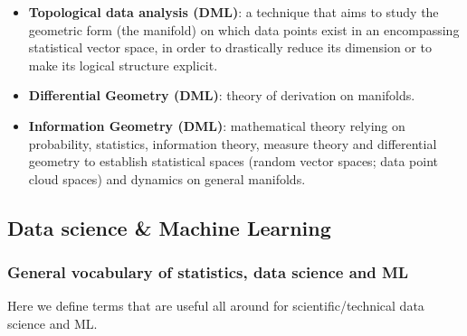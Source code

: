 \documentclass{article}
\begin{document}
\begin{itemize}
	\item \textbf{Topological data analysis (DML)}: a technique that aims to study the geometric form (the manifold) on which data points exist in an encompassing statistical vector space, in order to drastically reduce its dimension or to make its logical structure explicit.

	\item \textbf{Differential Geometry (DML)}: theory of derivation on manifolds.

	\item \textbf{Information Geometry (DML)}: mathematical theory relying on probability, statistics, information theory, measure theory and differential geometry to establish statistical spaces (random vector spaces; data point cloud spaces) and dynamics on general manifolds.

\end{itemize}




\subsection*{Data science \& Machine Learning}

\subsubsection*{General vocabulary of statistics, data science and ML}

Here we define terms that are useful all around for scientific/technical data science and ML.
\end{document}
